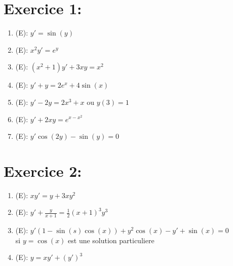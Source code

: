\documentclass[a4paper,12pt]{article}
\begin{document}
\section*{Exercice 1:}
\begin{enumerate}
	\vspace{1.5cm}
	\item (E): $y' = \sin(y)$ \\
	

	\vspace{1.5cm}
	\item (E): $x^2 y' = e^y$ \\
	

	\vspace{1.5cm}
	\item (E): $(x^2 + 1) y' + 3xy = x^2$ \\
	
		
	\vspace{1.5cm}
	\item (E): $y' + y = 2e^x + 4 \sin(x)$ \\
	
	
	\vspace{1.5cm}
	\item (E): $y' - 2y = 2x^3 + x \text{ ou } y(3)=1$ \\
	

	\vspace{1.5cm}
	\item (E): $y' + 2xy = e^{x-x^2}$

	\vspace{1.5cm}
	\item (E): $y' \cos(2y) - \sin(y) = 0$

\end{enumerate}


\section*{Exercice 2:}
\begin{enumerate}
	\vspace{1.5cm}
	\item (E): $xy' = y + 3xy^2$ \\
	
	
	\vspace{1.5cm}
	\item (E): $y' + \frac{y}{x+1} = \frac{1}{2} (x+1)^3 y^3$ \\
	
	
	\vspace{1.5cm}
	\item (E): $y' (1 -\sin(s)\cos(x)) + y^2\cos(x) -y' + \sin(x) = 0$ \\ si $y = \cos(x)$ est une solution particuliere
	
	\vspace{1.5cm}
	\item (E): $y = xy' + (y')^3$
\end{enumerate}
\end{document}
